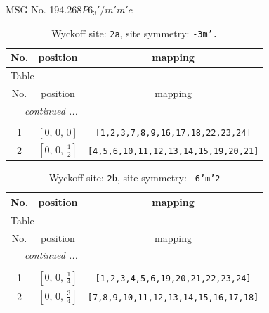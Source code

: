 \documentclass[fleqn,8pt]{jsarticle}
\begin{document}
\setcounter{MaxMatrixCols}{32}

\renewcommand{\tablename}{Table~}
\renewcommand{\figurename}{Figure~}
\begin{center}
\LARGE
MSG No. 194.268\quad$P6_{3}'/m'm'c$
\end{center}
\renewcommand{\arraystretch}{1.2}
\begin{longtable}{ccc}
\caption{Wyckoff site: {\tt 2a}, site symmetry: {\tt -3m'.}}
 \\
 \hline \hline
No. & position & mapping \\ \hline \endfirsthead

\multicolumn{2}{l}{\tablename\ \thetable{}} \\
 \hline \hline
No. & position & mapping \\ \hline \endhead

 \hline \hline
\multicolumn{2}{r}{\footnotesize\it continued ...} \\ \endfoot

 \hline \hline
\multicolumn{2}{r}{} \\ \endlastfoot

1 & $\left[ 0,\, 0,\, 0 \right]$ & {\tt [1,2,3,7,8,9,16,17,18,22,23,24]} \\ \hline
2 & $\left[ 0,\, 0,\, \frac{1}{2} \right]$ & {\tt [4,5,6,10,11,12,13,14,15,19,20,21]} \\
\end{longtable}
\renewcommand{\arraystretch}{1.2}
\begin{longtable}{ccc}
\caption{Wyckoff site: {\tt 2b}, site symmetry: {\tt -6'm'2}}
 \\
 \hline \hline
No. & position & mapping \\ \hline \endfirsthead

\multicolumn{2}{l}{\tablename\ \thetable{}} \\
 \hline \hline
No. & position & mapping \\ \hline \endhead

 \hline \hline
\multicolumn{2}{r}{\footnotesize\it continued ...} \\ \endfoot

 \hline \hline
\multicolumn{2}{r}{} \\ \endlastfoot

1 & $\left[ 0,\, 0,\, \frac{1}{4} \right]$ & {\tt [1,2,3,4,5,6,19,20,21,22,23,24]} \\ \hline
2 & $\left[ 0,\, 0,\, \frac{3}{4} \right]$ & {\tt [7,8,9,10,11,12,13,14,15,16,17,18]} \\
\end{longtable}
\end{document}

